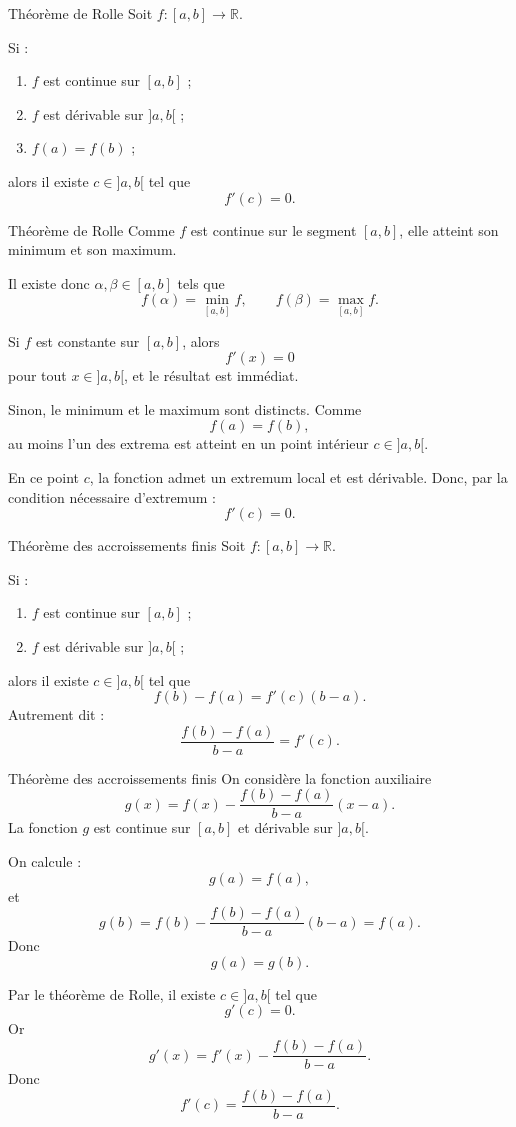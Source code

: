 \documentclass[11pt,a4paper]{article}
\newcommand{\R}{\mathbb{R}}
\begin{document}
\begin{theorembox}{Théorème de Rolle}
Soit $f:[a,b]\to\R$.

Si :
\begin{enumerate}[label=\arabic*)]
    \item $f$ est continue sur $[a,b]$ ;
    \item $f$ est dérivable sur $]a,b[$ ;
    \item $f(a)=f(b)$ ;
\end{enumerate}
alors il existe $c\in]a,b[$ tel que
\[
f'(c)=0.
\]
\end{theorembox}

\begin{proofbox}{Théorème de Rolle}
Comme $f$ est continue sur le segment $[a,b]$, elle atteint son minimum et son maximum.

Il existe donc $\alpha,\beta\in[a,b]$ tels que
\[
f(\alpha)=\min_{[a,b]} f,
\qquad
f(\beta)=\max_{[a,b]} f.
\]

Si $f$ est constante sur $[a,b]$, alors
\[
f'(x)=0
\]
pour tout $x\in]a,b[$, et le résultat est immédiat.

Sinon, le minimum et le maximum sont distincts. Comme
\[
f(a)=f(b),
\]
au moins l'un des extrema est atteint en un point intérieur $c\in]a,b[$.

En ce point $c$, la fonction admet un extremum local et est dérivable. Donc, par la condition nécessaire d'extremum :
\[
f'(c)=0.
\]
\end{proofbox}

\begin{theorembox}{Théorème des accroissements finis}
Soit $f:[a,b]\to\R$.

Si :
\begin{enumerate}[label=\arabic*)]
    \item $f$ est continue sur $[a,b]$ ;
    \item $f$ est dérivable sur $]a,b[$ ;
\end{enumerate}
alors il existe $c\in]a,b[$ tel que
\[
f(b)-f(a)=f'(c)(b-a).
\]
Autrement dit :
\[
\frac{f(b)-f(a)}{b-a}=f'(c).
\]
\end{theorembox}

\begin{proofbox}{Théorème des accroissements finis}
On considère la fonction auxiliaire
\[
g(x)=f(x)-\frac{f(b)-f(a)}{b-a}(x-a).
\]
La fonction $g$ est continue sur $[a,b]$ et dérivable sur $]a,b[$.

On calcule :
\[
g(a)=f(a),
\]
et
\[
g(b)=f(b)-\frac{f(b)-f(a)}{b-a}(b-a)=f(a).
\]
Donc
\[
g(a)=g(b).
\]

Par le théorème de Rolle, il existe $c\in]a,b[$ tel que
\[
g'(c)=0.
\]
Or
\[
g'(x)=f'(x)-\frac{f(b)-f(a)}{b-a}.
\]
Donc
\[
f'(c)=\frac{f(b)-f(a)}{b-a}.
\]
\end{proofbox}
\end{document}
